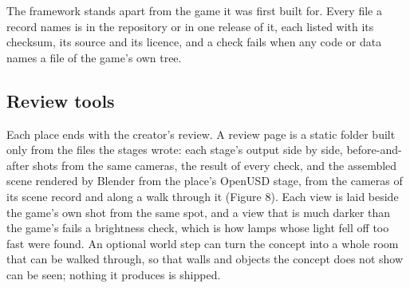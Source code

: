 The framework stands apart from the game it was first built for. Every file a record names is in the repository or in one release of it, each listed with its checksum, its source and its licence, and a check fails when any code or data names a file of the game's own tree.

\begin{center}\end{center}

\begin{center}\end{center}

\begin{center}\end{center}

\subsection{Review tools}\label{review-tools}

Each place ends with the creator's review. A review page is a static folder built only from the files the stages wrote: each stage's output side by side, before-and-after shots from the same cameras, the result of every check, and the assembled scene rendered by Blender from the place's OpenUSD stage, from the cameras of its scene record and along a walk through it (Figure 8). Each view is laid beside the game's own shot from the same spot, and a view that is much darker than the game's fails a brightness check, which is how lamps whose light fell off too fast were found. An optional world step can turn the concept into a whole room that can be walked through, so that walls and objects the concept does not show can be seen; nothing it produces is shipped.

